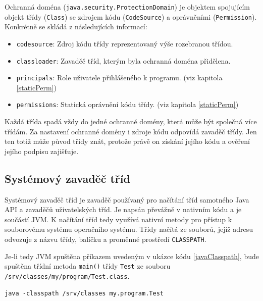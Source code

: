 Ochranná doména ({\tt java.security.ProtectionDomain}) je objektem spojujícím objekt třídy ({\tt Class}) se zdrojem kódu ({\tt CodeSource}) a oprávněními ({\tt Permission}). Konkrétně se skládá z následujících informací: \cite{sourceProtectionDomain}

\begin{itemize}
  \item {\tt codesource}: Zdroj kódu třídy reprezentovaný výše rozebranou třídou.
  \item {\tt classloader}: Zavaděč tříd, kterým byla ochranná doména přidělena.
  \item {\tt principals}: Role uživatele přihlášeného k programu. (viz kapitola \ref{staticPerm})
  \item {\tt permissions}: Statická oprávnění kódu třídy. (viz kapitola \ref{staticPerm})
\end{itemize}

Každá třída spadá vždy do jedné ochranné domény, která může být společná více třídám. Za nastavení ochranné domény i zdroje kódu odpovídá zavaděč třídy.
Jen ten totiž může původ třídy znát, protože právě on získání jejího kódu a ověření jejího podpisu zajišťuje.

\subsection{Systémový zavaděč tříd} \label{interniZavadec}

Systémový zavaděč tříd je zavaděč používaný pro načítání tříd samotného Java API a zavaděčů uživatelských tříd.
Je napsán převážně v nativním kódu a je součástí JVM. K načítání tříd tedy využívá nativní metody pro přístup k souborovému systému operačního systému.
Třídy načítá ze souborů, jejíž adresu odvozuje z názvu třídy, balíčku a proměnné prostředí {\tt CLASSPATH}. \cite[3.2.1]{oaks}

Je-li tedy JVM spuštěna příkazem uvedeným v ukázce kódu \ref{javaClasspath}, bude spuštěna třídní metoda {\tt main()} třídy {\tt Test}
ze souboru {\tt /srv/classes/my/program/Test.class}.

\begin{lstlisting}[caption=Spuštění JVM s hodnotou proměnné {\tt CLASSPATH} rovnou {\tt /srv/classes}, label=javaClasspath]
java -classpath /srv/classes my.program.Test
\end{lstlisting}


